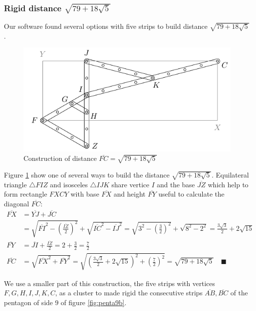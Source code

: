 \documentclass[11pt]{article}
\begin{document}
\subsubsection{Rigid distance $\sqrt{79 + 18\sqrt5}$}

Our software found several options with five strips to build distance $\sqrt{79 + 18\sqrt5}$.

\begin{figure}[H]
\centering
\includegraphics[scale=1]{9/cluster9b1}
\caption{Construction of distance $\overline{FC}=\sqrt{79 + 18\sqrt5}$}
\label{fig:cluster9b1}
\end{figure}

Figure \ref{fig:cluster9b1} show one of several ways to build the distance $\sqrt{79 + 18\sqrt5}$. 
Equilateral triangle $\triangle{FIZ}$ and isosceles $\triangle{IJK}$ share vertice $I$ and the base $\overline{JZ}$ which help to form rectangle $FXCY$ with base $\overline{FX}$ and height $\overline{FY}$ useful to calculate the diagonal $\overline{FC}$:
\begin{align}
\overline{FX} &= \overline{YJ} + \overline{JC}\nonumber\\
 &= \sqrt{\overline{FI}^2 - \left(\frac{\overline{IZ}}2\right)^2}
  + \sqrt{\overline{IC}^2 - \overline{IJ}^2}
  = \sqrt{3^2 - \left(\frac{3}2\right)^2} + \sqrt{8^2 - 2^2} 
  = \frac{3\sqrt3}2 + 2\sqrt{15} \nonumber\\
\overline{FY} &= \overline{JI} + \frac{\overline{IZ}}2
  = 2 + \frac{3}2 = \frac{7}2 \nonumber\\
\overline{FC} &= \sqrt{\overline{FX}^2 + \overline{FY}^2}
 = \sqrt{\left(\frac{3\sqrt3}2 + 2\sqrt{15}\right)^2 + \left(\frac{7}2\right)^2}
 = \sqrt{79 + 18\sqrt5} \quad\blacksquare
\end{align}

We use a smaller part of this construction, the five strips with vertices $F,G,H,I,J,K,C$, as a cluster to made rigid the consecutive strips $\overline{AB},\overline{BC}$ of the pentagon of side $9$ of figure \ref{fig:penta9b}.
\end{document}

